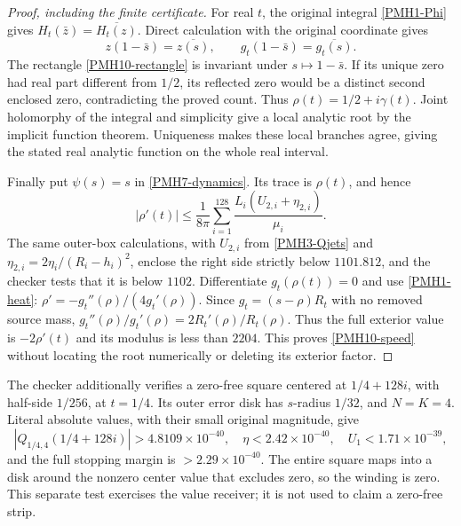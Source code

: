 \documentclass[11pt]{article}
\begin{document}
\begin{proof}[Proof, including the finite certificate]
For real $t$, the original integral \eqref{PMH1-Phi} gives
$H_t(\bar z)=\overline{H_t(z)}$. Direct calculation with the
original coordinate gives
\[
 z(1-\bar s)=\overline{z(s)},\qquad
 g_t(1-\bar s)=\overline{g_t(s)}.
\]
The rectangle \eqref{PMH10-rectangle} is invariant under
$s\mapsto1-\bar s$. If its unique zero had real part different
from $1/2$, its reflected zero would be a distinct second enclosed
zero, contradicting the proved count. Thus
$\rho(t)=1/2+i\gamma(t)$. Joint holomorphy of the integral and
simplicity give a local analytic root by the implicit function
theorem. Uniqueness makes these local branches agree, giving the
stated real analytic function on the whole real interval.

Finally put $\psi(s)=s$ in \eqref{PMH7-dynamics}. Its trace is
$\rho(t)$, and hence
\begin{equation}\label{PMH10-velocity-certificate}
 |\rho'(t)|\le\frac1{8\pi}\sum_{i=1}^{128}
        \frac{L_i(U_{2,i}+\eta_{2,i})}{\mu_i}.
\end{equation}
The same outer-box calculations, with $U_{2,i}$ from
\eqref{PMH3-Qjets} and
$\eta_{2,i}=2\eta_i/(R_i-h_i)^2$, enclose the right side strictly
below $1101.812$, and the checker tests that it is below $1102$.
Differentiate $g_t(\rho(t))=0$ and use
\eqref{PMH1-heat}: $\rho'=-g_t''(\rho)/(4g_t'(\rho))$.
Since $g_t=(s-\rho)R_t$ with no removed source mass,
$g_t''(\rho)/g_t'(\rho)=2R_t'(\rho)/R_t(\rho)$.
Thus the full exterior value is $-2\rho'(t)$ and its modulus is
less than $2204$. This proves \eqref{PMH10-speed} without locating
the root numerically or deleting its exterior factor.
\end{proof}

The checker additionally verifies a zero-free square centered at
$1/4+128i$, with half-side $1/256$, at $t=1/4$. Its outer error disk
has $s$-radius $1/32$, and $N=K=4$. Literal absolute values, with
their small original magnitude, give
\[
 |Q_{1/4,4}(1/4+128i)|>4.8109\times10^{-40},\quad
 \eta<2.42\times10^{-40},\quad U_1<1.71\times10^{-39},
\]
and the full stopping margin is $>2.29\times10^{-40}$.
The entire square maps into a disk around the nonzero center
value that excludes zero, so the winding is zero. This separate
test exercises the value receiver; it is not used to claim a
zero-free strip.
\end{document}
